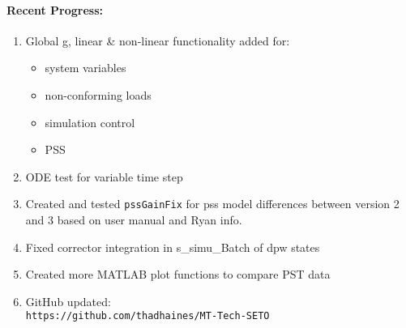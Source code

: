\documentclass[12pt]{article}
\begin{document}
\begin{multicols}{2}
\raggedright

\paragraph{Recent Progress:}
	\begin{enumerate}
		\itemsep0em 
		\item Global g, linear \& non-linear functionality added for:
		\begin{minipage}{\linewidth}
				\begin{itemize}
		\itemsep0em 
				\footnotesize
					\item system variables
					\item non-conforming loads
					\item simulation control
					\item PSS
				\end{itemize}
		\end{minipage}
		\item ODE test for variable time step\
		\item Created and tested \verb|pssGainFix| for pss model differences between version 2 and 3 based on user manual and Ryan info.
		\item Fixed corrector integration in s\_simu\_Batch of dpw states
		\item Created more MATLAB plot functions to compare PST data
		\item GitHub updated:\\
	{\footnotesize	\verb|https://github.com/thadhaines/MT-Tech-SETO| }\\
	\end{enumerate}
	


\end{multicols}
\end{document}

